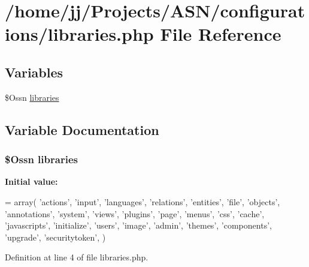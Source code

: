 \hypertarget{libraries_8php}{}\section{/home/jj/\+Projects/\+A\+S\+N/configurations/libraries.php File Reference}
\label{libraries_8php}
\subsection*{Variables}
\begin{DoxyCompactItemize}
\item 
\$Ossn \hyperlink{libraries_8php_a0b2688fe4e942da712de62754d0efdc8}{libraries}
\end{DoxyCompactItemize}


\subsection{Variable Documentation}
\subsubsection[{\texorpdfstring{libraries}{libraries}}]{\setlength{\rightskip}{0pt plus 5cm}\$Ossn libraries}\hypertarget{libraries_8php_a0b2688fe4e942da712de62754d0efdc8}{}\label{libraries_8php_a0b2688fe4e942da712de62754d0efdc8}
{\bfseries Initial value\+:}
\begin{DoxyCode}
= array(
    \textcolor{stringliteral}{'actions'},
    \textcolor{stringliteral}{'input'},
    \textcolor{stringliteral}{'languages'},
    \textcolor{stringliteral}{'relations'},
    \textcolor{stringliteral}{'entities'},
    \textcolor{stringliteral}{'file'},
    \textcolor{stringliteral}{'objects'},
    \textcolor{stringliteral}{'annotations'},
    \textcolor{stringliteral}{'system'},
    \textcolor{stringliteral}{'views'},
    \textcolor{stringliteral}{'plugins'},
    \textcolor{stringliteral}{'page'},
    \textcolor{stringliteral}{'menus'},
    \textcolor{stringliteral}{'css'},
    \textcolor{stringliteral}{'cache'},
    \textcolor{stringliteral}{'javascripts'},
    \textcolor{stringliteral}{'initialize'},
    \textcolor{stringliteral}{'users'},
    \textcolor{stringliteral}{'image'},
    \textcolor{stringliteral}{'admin'},
    \textcolor{stringliteral}{'themes'},
    \textcolor{stringliteral}{'components'},
    \textcolor{stringliteral}{'upgrade'},
    \textcolor{stringliteral}{'securitytoken'},
)
\end{DoxyCode}


Definition at line 4 of file libraries.\+php.

